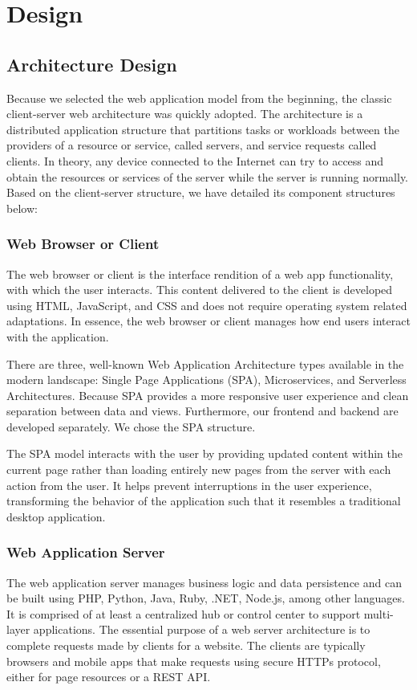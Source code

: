 \section{Design}
\label{sec:Design}

\subsection{Architecture Design}
\label{sec:Design>Architecture Design}
Because we selected the web application model from the beginning, the classic client-server web architecture was quickly adopted. The architecture is a distributed application structure that partitions tasks or workloads between the providers of a resource or service, called servers, and service requests called clients. In theory, any device connected to the Internet can try to access and obtain the resources or services of the server while the server is running normally. Based on the client-server structure, we have detailed its component structures below:

\subsubsection{Web Browser or Client}
\label{sec:Design>Architecture Design>Web Browser or Client}
The web browser or client is the interface rendition of a web app functionality, with which the user interacts. This content delivered to the client is developed using HTML, JavaScript, and CSS and does not require operating system related adaptations. In essence, the web browser or client manages how end users interact with the application.

There are three, well-known Web Application Architecture types available in the modern landscape: Single Page Applications (SPA), Microservices, and Serverless Architectures. Because SPA provides a more responsive user experience and clean separation between data and views. Furthermore, our frontend and backend are developed separately. We chose the SPA structure.

The SPA model interacts with the user by providing updated content within the current page rather than loading entirely new pages from the server with each action from the user. It helps prevent interruptions in the user experience, transforming the behavior of the application such that it resembles a traditional desktop application.

\subsubsection{Web Application Server}
\label{sec:Design>Architecture Design>Web Application Server}
The web application server manages business logic and data persistence and can be built using PHP, Python, Java, Ruby, .NET, Node.js, among other languages. It is comprised of at least a centralized hub or control center to support multi-layer applications. The essential purpose of a web server architecture is to complete requests made by clients for a website. The clients are typically browsers and mobile apps that make requests using secure HTTPs protocol, either for page resources or a REST API.

